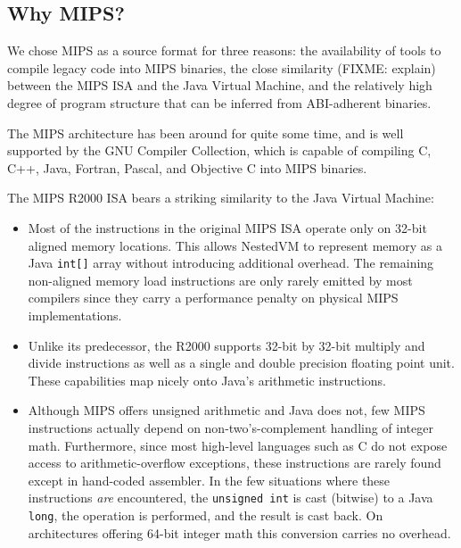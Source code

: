 \documentclass{acmconf}
\begin{document}
\subsection{Why MIPS?}

We chose MIPS as a source format for three reasons: the availability
of tools to compile legacy code into MIPS binaries, the close
similarity (FIXME: explain) between the MIPS ISA and the Java Virtual
Machine, and the relatively high degree of program structure that can
be inferred from ABI-adherent binaries.

The MIPS architecture has been around for quite some time, and is well
supported by the GNU Compiler Collection, which is capable of
compiling C, C++, Java, Fortran, Pascal, and Objective C
into MIPS binaries.

The MIPS R2000 ISA bears a striking similarity to the Java Virtual
Machine:

\begin{itemize}

\item Most of the instructions in the original MIPS ISA operate only
      on 32-bit aligned memory locations. This allows NestedVM to
      represent memory as a Java {\tt int[]} array without introducing
      additional overhead.  The remaining non-aligned memory load
      instructions are only rarely emitted by most compilers since
      they carry a performance penalty on physical MIPS
      implementations.

\item Unlike its predecessor, the R2000 supports 32-bit by 32-bit
      multiply and divide instructions as well as a single and double
      precision floating point unit.  These capabilities map nicely
      onto Java's arithmetic instructions.

\item Although MIPS offers unsigned arithmetic and Java does not, few
      MIPS instructions actually depend on non-two's-complement
      handling of integer math.  Furthermore, since most high-level
      languages such as C do not expose access to arithmetic-overflow
      exceptions, these instructions are rarely found except in
      hand-coded assembler.  In the few situations where these
      instructions {\it are} encountered, the {\tt unsigned int} is
      cast (bitwise) to a Java {\tt long}, the operation is performed,
      and the result is cast back.  On architectures offering 64-bit
      integer math this conversion carries no overhead.
      
\end{itemize}
\end{document}
